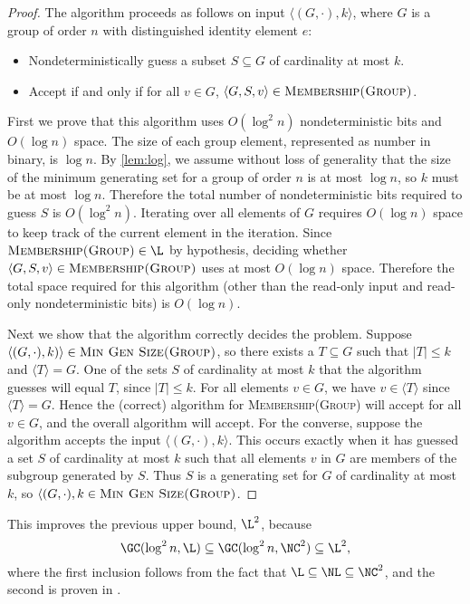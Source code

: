 \documentclass{article}
\newcommand{\gen}[1]{{\langle #1 \rangle}}
\begin{document}
\begin{proof}
  The algorithm proceeds as follows on input $\langle (G, \cdot), k \rangle$, where $G$ is a group of order $n$ with distinguished identity element $e$:
  \begin{itemize}
  \item Nondeterministically guess a subset $S \subseteq G$ of cardinality at most $k$.
  \item Accept if and only if for all $v \in G$, $\langle G, S, v \rangle \in \textsc{Membership(Group)}$.
  \end{itemize}

  First we prove that this algorithm uses $O(\log^2 n)$ nondeterministic bits and $O(\log n)$ space.
  The size of each group element, represented as number in binary, is $\log n$.
  By \autoref{lem:log}, we assume without loss of generality that the size of the minimum generating set for a group of order $n$ is at most $\log n$, so $k$ must be at most $\log n$.
  Therefore the total number of nondeterministic bits required to guess $S$ is $O(\log^2 n)$.
  Iterating over all elements of $G$ requires $O(\log n)$ space to keep track of the current element in the iteration.
  Since $\textsc{Membership(Group)} \in \L$ by hypothesis, deciding whether $\langle G, S, v \rangle \in \textsc{Membership(Group)}$ uses at most $O(\log n)$ space.
  Therefore the total space required for this algorithm (other than the read-only input and read-only nondeterministic bits) is $O(\log n)$.

  Next we show that the algorithm correctly decides the problem.
  Suppose $\langle (G, \cdot), k) \rangle \in \textsc{Min Gen Size(Group)}$, so there exists a $T \subseteq G$ such that $|T| \leq k$ and $\gen{T} = G$.
  One of the sets $S$ of cardinality at most $k$ that the algorithm guesses will equal $T$, since $|T| \leq k$.
  For all elements $v \in G$, we have $v \in \gen{T}$ since $\gen{T} = G$.
  Hence the (correct) algorithm for \textsc{Membership(Group)} will accept for all $v \in G$, and the overall algorithm will accept.
  For the converse, suppose the algorithm accepts the input $\langle (G, \cdot), k \rangle$.
  This occurs exactly when it has guessed a set $S$ of cardinality at most $k$ such that all elements $v$ in $G$ are members of the subgroup generated by $S$.
  Thus $S$ is a generating set for $G$ of cardinality at most $k$, so $\langle (G, \cdot), k \in \textsc{Min Gen Size(Group)}$.
\end{proof}

This improves the previous upper bound, $\L^2$, because
\begin{equation*}
  \GC(\log^2 n, \L) \subseteq \GC(\log^2 n, \NC^2) \subseteq \L^2,
\end{equation*}
where the first inclusion follows from the fact that $\L \subseteq \NL \subseteq \NC^2$, and the second is proven in \cite[Lemma~3.2.8]{wolf90}.
\end{document}
